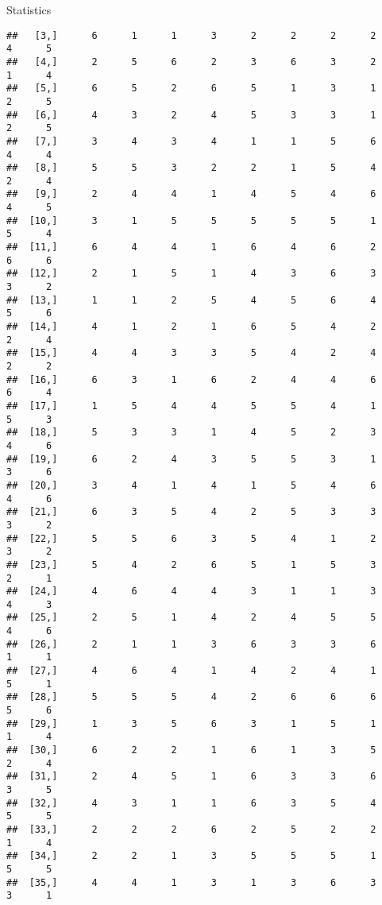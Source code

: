 \documentclass[
  ignorenonframetext,
]{beamer}
\begin{document}
\begin{frame}[fragile]{Statistics}
\begin{verbatim}
##   [3,]      6      1      1      3      2      2      2      2      4      5
##   [4,]      2      5      6      2      3      6      3      2      1      4
##   [5,]      6      5      2      6      5      1      3      1      2      5
##   [6,]      4      3      2      4      5      3      3      1      2      5
##   [7,]      3      4      3      4      1      1      5      6      4      4
##   [8,]      5      5      3      2      2      1      5      4      2      4
##   [9,]      2      4      4      1      4      5      4      6      4      5
##  [10,]      3      1      5      5      5      5      5      1      5      4
##  [11,]      6      4      4      1      6      4      6      2      6      6
##  [12,]      2      1      5      1      4      3      6      3      3      2
##  [13,]      1      1      2      5      4      5      6      4      5      6
##  [14,]      4      1      2      1      6      5      4      2      2      4
##  [15,]      4      4      3      3      5      4      2      4      2      2
##  [16,]      6      3      1      6      2      4      4      6      6      4
##  [17,]      1      5      4      4      5      5      4      1      5      3
##  [18,]      5      3      3      1      4      5      2      3      4      6
##  [19,]      6      2      4      3      5      5      3      1      3      6
##  [20,]      3      4      1      4      1      5      4      6      4      6
##  [21,]      6      3      5      4      2      5      3      3      3      2
##  [22,]      5      5      6      3      5      4      1      2      3      2
##  [23,]      5      4      2      6      5      1      5      3      2      1
##  [24,]      4      6      4      4      3      1      1      3      4      3
##  [25,]      2      5      1      4      2      4      5      5      4      6
##  [26,]      2      1      1      3      6      3      3      6      1      1
##  [27,]      4      6      4      1      4      2      4      1      5      1
##  [28,]      5      5      5      4      2      6      6      6      5      6
##  [29,]      1      3      5      6      3      1      5      1      1      4
##  [30,]      6      2      2      1      6      1      3      5      2      4
##  [31,]      2      4      5      1      6      3      3      6      3      5
##  [32,]      4      3      1      1      6      3      5      4      5      5
##  [33,]      2      2      2      6      2      5      2      2      1      4
##  [34,]      2      2      1      3      5      5      5      1      5      5
##  [35,]      4      4      1      3      1      3      6      3      3      1

\end{verbatim}
\end{frame}
\end{document}
